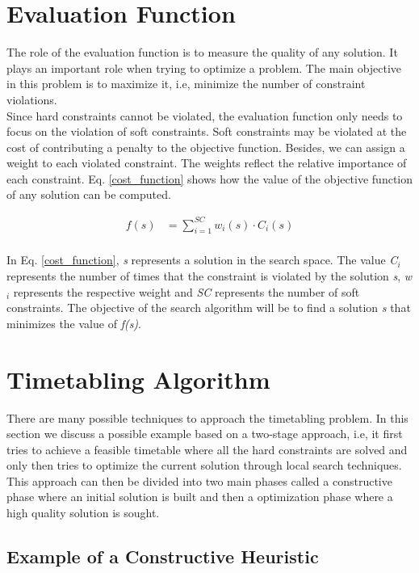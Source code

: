 \section{Evaluation Function}
The role of the evaluation function is to measure the quality of any solution. It plays an important role when trying to optimize a problem. The main objective in this problem is to maximize it, i.e, minimize the number of constraint violations.\\
Since hard constraints cannot be violated, the evaluation function only needs to focus on the violation of soft constraints. Soft constraints may be violated at the cost of contributing a penalty to the objective function. Besides, we can assign a weight to each violated constraint. The weights reflect the relative importance of each constraint. Eq. \ref{cost_function} shows how the value of the objective function of any solution can be computed.

\begin{equation}
\label{cost_function}
\begin{split}
	f(s) &= \sum_{i=1}^{SC} w_i(s) \cdot C_i(s) \\
\end{split}
\end{equation}

In Eq. \ref{cost_function}, \textit{s} represents a solution in the search space. The value \textit{C$_i$} represents the number of times that the constraint is violated by the solution \textit{s}, \textit{w$_i$} represents the respective weight and \textit{SC} represents the number of soft constraints. The objective of the search algorithm will be to find a solution \textit{s} that minimizes the value of \textit{f(s)}.

\section{Timetabling Algorithm}

There are many possible techniques to approach the timetabling problem. In this section we discuss a possible example based on a two-stage approach, i.e, it first tries to achieve a feasible timetable where all the hard constraints are solved and only then tries to optimize the current solution through local search techniques. This approach can then be divided into two main phases called a constructive phase where an initial solution is built and then a optimization phase where a high quality solution is sought.

\subsection{Example of a Constructive Heuristic}

